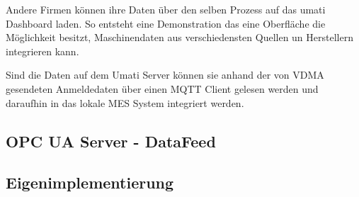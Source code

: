 \documentclass[a4paper, 12pt, oneside]{scrbook}
\begin{document}
		Andere Firmen können ihre Daten über den selben Prozess auf das umati Dashboard laden. So entsteht eine Demonstration das eine Oberfläche die Möglichkeit besitzt, Maschinendaten aus verschiedensten Quellen un Herstellern integrieren kann. 
		
		Sind die Daten auf dem Umati Server können sie anhand der von VDMA gesendeten Anmeldedaten über einen MQTT Client gelesen werden und daraufhin in das lokale MES System integriert werden.
		

		\subsection{OPC UA Server - DataFeed}
		
		
		
		
		\subsection{Eigenimplementierung}
		
		
		
		
\end{document}
